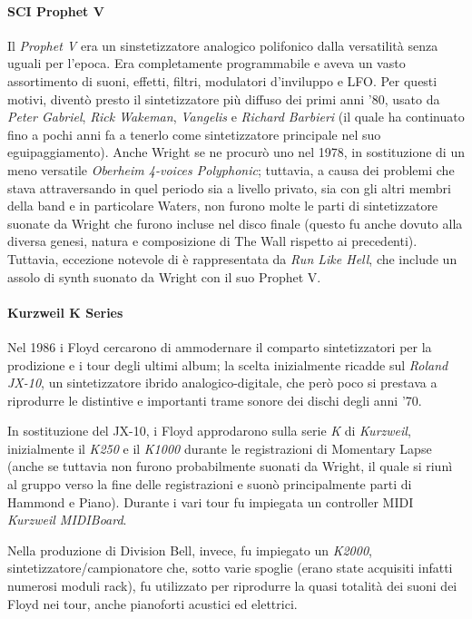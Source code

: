 \documentclass[class=book, crop=false, oneside, 12pt]{standalone}
\begin{document}
    \paragraph{SCI Prophet V}
    Il \emph{Prophet V} era un sinstetizzatore analogico polifonico dalla versatilità senza uguali per l'epoca. Era completamente programmabile e aveva un vasto assortimento di suoni, effetti, filtri, modulatori d'inviluppo e LFO. Per questi motivi, diventò presto il sintetizzatore più diffuso dei primi anni '80, usato da \emph{Peter Gabriel}, \emph{Rick Wakeman}, \emph{Vangelis} e \emph{Richard Barbieri} (il quale ha continuato fino a pochi anni fa a tenerlo come sintetizzatore principale nel suo eguipaggiamento). Anche Wright se ne procurò uno nel 1978, in sostituzione di un meno versatile \emph{Oberheim 4-voices Polyphonic}; tuttavia, a causa dei problemi che stava attraversando in quel periodo sia a livello privato, sia con gli altri membri della band e in particolare Waters, non furono molte le parti di sintetizzatore suonate da Wright che furono incluse nel disco finale (questo fu anche dovuto alla diversa genesi, natura e composizione di The Wall rispetto ai precedenti). Tuttavia, eccezione notevole di è rappresentata da \emph{Run Like Hell}, che include un assolo di synth suonato da Wright con il suo Prophet V.

    \paragraph{Kurzweil K Series}
    Nel 1986 i Floyd cercarono di ammodernare il comparto sintetizzatori per la prodizione e i  tour degli ultimi album; la scelta inizialmente ricadde sul \emph{Roland JX-10}, un sintetizzatore ibrido analogico-digitale, che però poco si prestava a riprodurre le distintive e importanti trame sonore dei dischi degli anni '70.

    In sostituzione del JX-10, i Floyd approdarono sulla serie \emph{K} di \emph{Kurzweil}, inizialmente il \emph{K250} e il \emph{K1000} durante le registrazioni di Momentary Lapse (anche se tuttavia non furono probabilmente suonati da Wright, il quale si riunì al gruppo verso la fine delle registrazioni e suonò principalmente parti di Hammond e Piano). Durante i vari tour fu impiegata un controller MIDI \emph{Kurzweil MIDIBoard}.

    Nella produzione di Division Bell, invece, fu impiegato un \emph{K2000}, sintetizzatore/campionatore che, sotto varie spoglie (erano state acquisiti infatti numerosi moduli rack), fu utilizzato per riprodurre la quasi totalità dei suoni dei Floyd nei tour, anche pianoforti acustici ed elettrici.
\end{document}
